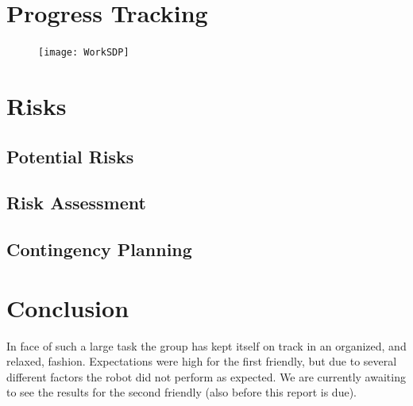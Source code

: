 \documentclass[a4paper,12pt]{article}
\begin{document}
\section{Progress Tracking}


\begin{figure}[H]
    \centering
    \texttt{[image: WorkSDP]}
    \label{fig:robot}
\end{figure}
	\vfill

\section{Risks}

\subsection{Potential Risks}


\subsection{Risk Assessment}


\subsection{Contingency Planning}


\section{Conclusion}
In face of such a large task the group has kept itself on track in an organized, and relaxed, fashion. Expectations were high for the first friendly, but due to several different factors the robot did not perform as expected. We are currently awaiting to see the results for the second friendly (also before this report is due).
\end{document}
